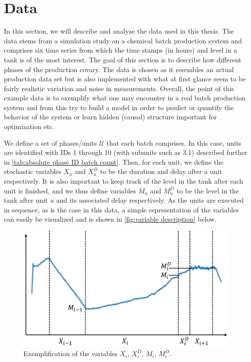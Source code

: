\documentclass[../Thesis.tex]{subfiles}
\begin{document}
\chapter{Data}

In this section, we will describe and analyze the data used in this thesis. The data stems from a simulation study on a chemical batch production system and comprises six time series from which the time stamps (in hours) and level in a tank is of the most interest. The goal of this section is to describe how different phases of the production covary. The data is chosen as it resembles an actual production data set but is also implemented with what at first glance seem to be fairly realistic variation and noise in measurements. Overall, the point of this example data is to exemplify what one may encounter in a real batch production system and from this try to build a model in order to predict or quantify the behavior of the system or learn hidden (causal) structure important for optimization etc. 

We define a set of phases/units $\mathcal{U}$ that each batch comprises. In this case, units are identified with IDs 1 through 10 (with subunits such as 3.1) described further in \autoref{tab:absolute phase ID batch count}. Then, for each unit, we define the stochastic variables $X_u$ and $X^D_u$ to be the duration and delay after a unit respectively. It is also important to keep track of the level in the tank after each unit is finished, and we thus define variables $M_u$ and $M^D_u$ to be the level in the tank after unit $u$ and its associated delay respectively. As the units are executed in sequence, as is the case in this data, a simple representation of the variables can easily be visualized and is shown in \autoref{fig:variable description} below.

\begin{figure}[h]
    \centering
    \includegraphics[width=.7\linewidth]{figures/Multiple cycles data/variable desciption.png}
    \caption{Exemplification of the variables $X_i$, $X^D_i$, $M_i$, $M^D_i$.}
    \label{fig:variable description}
\end{figure}
\end{document}
